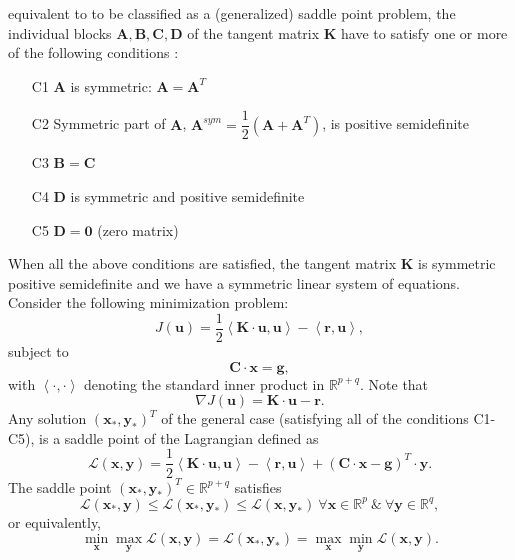 equivalent to  to be classified as a (generalized) saddle point problem, the individual blocks $\mathbf{A}, \mathbf{B}, \mathbf{C}, \mathbf{D}$ of the tangent matrix $\mathbf{K}$ have to satisfy one or more of the following conditions \cite{Benzi2005}:
\begin{itemize}
\item[C1] $\mathbf{A}$ is symmetric: $\mathbf{A} = \mathbf{A}^T$
\item[C2] Symmetric part of $\mathbf{A}$, $\mathbf{A}^{sym} = \dfrac{1}{2} \left( \mathbf{A} + \mathbf{A}^T \right)$, is positive semidefinite
\item[C3] $\mathbf{B} = \mathbf{C}$
\item[C4] $\mathbf{D}$ is symmetric and positive semidefinite
\item[C5] $\mathbf{D} = \mathbf{0}$ (zero matrix)
\end{itemize}
When all the above conditions are satisfied, the tangent matrix $\mathbf{K}$ is symmetric positive semidefinite and we have a symmetric linear system of equations. Consider the following minimization problem:
\begin{equation}
J(\mathbf{u}) = \dfrac{1}{2} \left\langle \mathbf{K} \cdot \mathbf{u}, \mathbf{u} \right\rangle - \left\langle \mathbf{r}, \mathbf{u} \right\rangle,
\label{eq:3.12}
\end{equation}
subject to 
\begin{equation}
\mathbf{C} \cdot \mathbf{x} = \mathbf{g},
\label{eq:3.13}
\end{equation}
with $\left\langle \cdot, \cdot \right\rangle$ denoting the standard inner product in $\mathbb{R}^{p+q}$.
Note that
\begin{equation}
\nabla J(\mathbf{u}) = \mathbf{K} \cdot \mathbf{u} - \mathbf{r}.
\end{equation}
Any solution $(\mathbf{x}_{\ast}, \mathbf{y}_{\ast})^T$ of the general case (satisfying all of the conditions C1-C5), is a saddle point of the Lagrangian defined as
\begin{equation}
\mathcal{L}(\mathbf{x}, \mathbf{y}) = \dfrac{1}{2} \left\langle \mathbf{K} \cdot \mathbf{u}, \mathbf{u} \right\rangle - \left\langle \mathbf{r}, \mathbf{u} \right\rangle + (\mathbf{C} \cdot \mathbf{x} - \mathbf{g})^T \cdot \mathbf{y}.
\label{eq:3.14}
\end{equation}
The saddle point $(\mathbf{x}_{\ast}, \mathbf{y}_{\ast})^T \in \mathbb{R}^{p+q}$ satisfies
\begin{equation}
\mathcal{L}(\mathbf{x}_{\ast}, \mathbf{y}) \leq \mathcal{L}(\mathbf{x}_{\ast}, \mathbf{y}_{\ast}) \leq \mathcal{L}(\mathbf{x}, \mathbf{y}_{\ast}) \ \forall \mathbf{x} \in \mathbb{R}^p \ \& \ \forall \mathbf{y} \in \mathbb{R}^q, 
\label{eq:3.15.1}
\end{equation}
or equivalently, 
\begin{equation}
\min_{\mathbf{x}} \max_{\mathbf{y}} \mathcal{L}(\mathbf{x}, \mathbf{y}) = \mathcal{L}(\mathbf{x}_{\ast}, \mathbf{y}_{\ast}) = \max_{\mathbf{x}} \min_{\mathbf{y}} \mathcal{L}(\mathbf{x}, \mathbf{y}).
\label{eq:3.15.2}
\end{equation}

